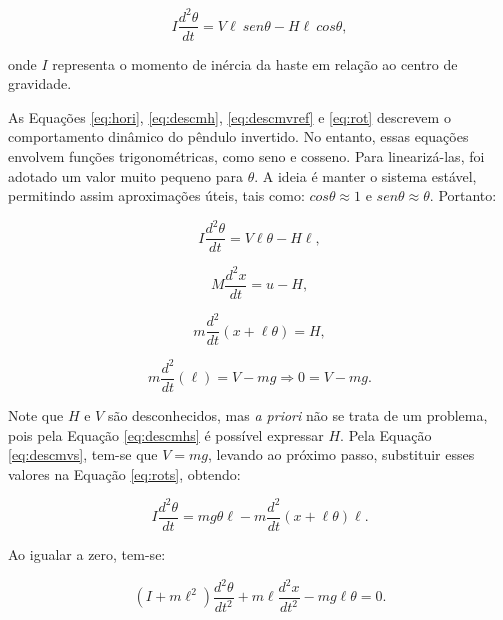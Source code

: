 \documentclass[12pt,           %
a4paper,                       %
openany,                       %
oneside,                       %
chapter=TITLE,                 %
english,                       %
spanish,                       %
brazil,                        %
sumario=tradicional]{abntex2}  %
\begin{document}
\begin{OnehalfSpace}
\begin{equation}
    I\frac{d^2\theta}{dt} = V\ell\:sen\theta - H\ell\:cos\theta,
    \label{eq:rot}
\end{equation}

\noindent onde $I$ representa o momento de inércia da haste em relação ao centro de gravidade.

As Equações \ref{eq:hori}, \ref{eq:descmh}, \ref{eq:descmvref} e \ref{eq:rot} descrevem o comportamento dinâmico do pêndulo invertido. No entanto, essas equações envolvem funções trigonométricas, como seno e cosseno. Para linearizá-las, foi adotado um valor muito pequeno para $\theta$. A ideia é manter o sistema estável, permitindo assim aproximações úteis, tais como:  $cos\theta \approx 1$ e $sen\theta \approx \theta$. Portanto:

\begin{equation}
    I\frac{d^2\theta}{dt} = V\ell\theta - H\ell,
    \label{eq:rots}
\end{equation}

\begin{equation}
    M\frac{d^2x}{dt} = u - H,
    \label{eq:horis}
\end{equation}

\begin{equation}
    m\frac{d^2}{dt}(x+\ell\theta) = H,
    \label{eq:descmhs}
\end{equation}

\begin{equation}
    m\frac{d^2}{dt}(\ell) = V - mg\Longrightarrow  0 = V-mg.
    \label{eq:descmvs}
\end{equation}

Note que $H$ e $V$ são desconhecidos, mas \textit{a priori} não se trata de um problema, pois pela Equação \ref{eq:descmhs} é possível expressar $H$. Pela Equação \ref{eq:descmvs}, tem-se que $V = mg$, levando ao próximo passo, substituir esses valores na Equação \ref{eq:rots}, obtendo:

\begin{equation}
    I\frac{d^2\theta}{dt} = mg\theta\ell-m \frac{d^2}{dt} (x+\ell\theta)\ell.
    \label{eq:HeV}
\end{equation}

Ao igualar a zero, tem-se:

\begin{equation}
    (I + m\ell^2)\frac{d^2\theta}{dt^2} + m\ell\frac{d^2x}{dt^2} - mg\ell\theta = 0.
    \label{eq:HeV0}
\end{equation}


\end{OnehalfSpace}
\end{document}
